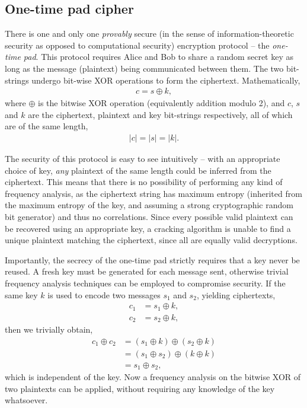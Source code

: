 %
%

\subsection{One-time pad cipher}

There is one and only one \textit{provably} secure (in the sense of information-theoretic security as opposed to computational security) encryption protocol -- the \textit{one-time pad}. This protocol requires Alice and Bob to share a random secret key as long as the message (plaintext) being communicated between them. The two bit-strings undergo bit-wise XOR operations to form the ciphertext. Mathematically,
\begin{align}
c = s \oplus k,
\end{align}
where $\oplus$ is the bitwise XOR operation (equivalently addition modulo 2), and $c$, $s$ and $k$ are the ciphertext, plaintext and key bit-strings respectively, all of which are of the same length,
\begin{align}
	|c|=|s|=|k|.
\end{align}

The security of this protocol is easy to see intuitively -- with an appropriate choice of key, \textit{any} plaintext of the same length could be inferred from the ciphertext. This means that there is no possibility of performing any kind of frequency analysis, as the ciphertext string has maximum entropy (inherited from the maximum entropy of the key, and assuming a strong cryptographic random bit generator) and thus no correlations. Since every possible valid plaintext can be recovered using an appropriate key, a cracking algorithm is unable to find a unique plaintext matching the ciphertext, since all are equally valid decryptions.

Importantly, the secrecy of the one-time pad strictly requires that a key never be reused. A fresh key must be generated for each message sent, otherwise trivial frequency analysis techniques can be employed to compromise security. If the same key $k$ is used to encode two messages $s_1$ and $s_2$, yielding ciphertexts,
\begin{align}
c_1&=s_1\oplus k,\nonumber\\
c_2&=s_2\oplus k,
\end{align}
then we trivially obtain,
\begin{align}
c_1 \oplus c_2 &= (s_1 \oplus k) \oplus (s_2 \oplus k) \nonumber \\
&= (s_1 \oplus s_2) \oplus (k \oplus k) \nonumber \\
&= s_1 \oplus s_2,
\end{align}
which is independent of the key. Now a frequency analysis on the bitwise XOR of two plaintexts can be applied, without requiring any knowledge of the key whatsoever.

